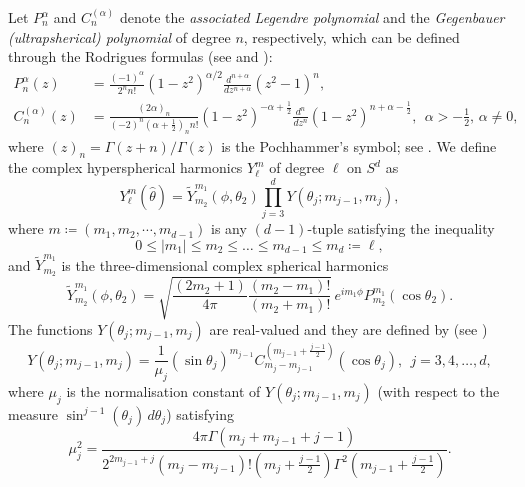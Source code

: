 \documentclass[11pt]{amsart}
\theoremstyle{definition}
\theoremstyle{plain}
\theoremstyle{remark}
\newcommand{\abs}[1]{\lvert{#1}\rvert}
\begin{document}
Let $P_n^\alpha$ and $C_n^{(\alpha)}$ denote the \emph{associated Legendre polynomial} and the \emph{Gegenbauer (ultrapsherical) polynomial} of degree $n$, respectively, which can be defined through the Rodrigues formulas (see \cite[Table.~18.5.1]{NIST} and \cite[Eqs.~6.27 \& 6.29]{Williams}):
\begin{align*} 
P_n^\alpha(z) & = \frac{(-1)^\alpha}{2^n n!}(1 - z^2)^{\alpha/2}\frac{d^{n + \alpha}}{dz^{n + \alpha}}\left(z^2 - 1\right)^n, \\ 
C_n^{(\alpha)}(z) & = \frac{(2\alpha)_n}{(-2)^n\left(\alpha + \frac{1}{2}\right)_n n!}\left(1 - z^2\right)^{-\alpha + \frac{1}{2}}\frac{d^n}{dz^n}\left(1 - z^2\right)^{n + \alpha - \frac{1}{2}}, \ \ \alpha > - \frac{1}{2}, \, \alpha\neq 0, 
\end{align*} 
where $(z)_n = \Gamma(z + n)/\Gamma(z)$ is the Pochhammer's symbol; see \cite[Eq.~5.2.5]{NIST}. We define the complex hyperspherical harmonics $Y_\ell^m$ of degree $\ell$ on $S^d$ as 
\begin{equation*} 
Y_\ell^m(\hat\theta) = \widetilde Y_{m_2}^{m_1}(\phi, \theta_2)\prod_{j = 3}^d Y(\theta_j; m_{j - 1}, m_j), 
\end{equation*} 
where $m\coloneqq \left(m_1, m_2, \cdots, m_{d - 1}\right)$ is any $(d - 1)$-tuple satisfying the inequality 
\begin{equation} \label{eq:SH_tuple}
0\le \abs{m_1}\le m_2\le \dots\le m_{d - 1}\le m_d\coloneqq\ell, 
\end{equation} 
and $\widetilde Y_{m_2}^{m_1}$ is the three-dimensional complex spherical harmonics
\begin{equation*} 
\widetilde Y_{m_2}^{m_1}(\phi, \theta_2) = \sqrt{\frac{(2m_2 + 1)}{4\pi}\frac{(m_2 - m_1)!}{(m_2 + m_1)!}}\, e^{im_1\phi}P_{m_2}^{m_1}(\cos\theta_2). 
\end{equation*}
The functions $Y(\theta_j; m_{j - 1}, m_j)$ are real-valued and they are defined by (see \cite[Section II]{wen1985})
\begin{equation*} 
Y(\theta_j; m_{j - 1}, m_j) = \frac{1}{\mu_j}\left(\sin\theta_j\right)^{m_{j - 1}}C_{m_j - m_{j - 1}}^{\left(m_{j - 1} + \frac{j - 1}{2}\right)}(\cos\theta_j), \ \ j = 3, 4, \dots, d, 
\end{equation*} 
where $\mu_j$ is the normalisation constant of $Y(\theta_j; m_{j - 1}, m_j)$ (with respect to the measure $\sin^{j - 1}(\theta_j)\, d\theta_j$) satisfying 
\begin{equation*} 
\mu_j^2 = \frac{4\pi\Gamma(m_j + m_{j - 1} + j - 1)}{2^{2m_{j - 1} + j}(m_j - m_{j - 1})!\left(m_j + \frac{j - 1}{2}\right)\Gamma^2\left(m_{j - 1} + \frac{j - 1}{2}\right)}. 
\end{equation*} 
\end{document}
